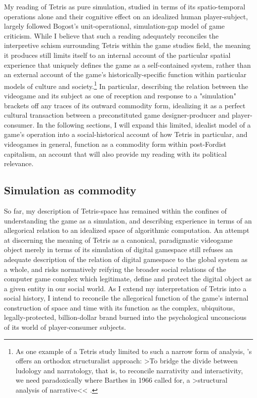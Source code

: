 My reading of Tetris as pure simulation, studied in terms of its spatio-temporal operations alone and their cognitive effect on an idealized human player-subject, largely followed Bogost's unit-operational, simulation-gap model of game criticism. While I believe that such a reading adequately reconciles the interpretive schism surrounding Tetris within the game studies field, the meaning it produces still limits itself to an internal account of the particular spatial experience that uniquely defines the game as a self-contained system, rather than an external account of the game's historically-specific function within particular models of culture and society.\footnote{
  As one example of a Tetris study limited to such a narrow form of analysis, \citeauthor{Post2009}'s  offers an orthodox structuralist approach: >To bridge the divide between ludology and narratology, that is, to reconcile narrativity and interactivity, we need paradoxically where Barthes in 1966 called for, a >structural analysis of narrative<< \autocite[36]{Post2009}.
  }
In particular, describing the relation between the videogame and its subject as one of reception and response to a "simulation" brackets off any traces of its outward commodity form, idealizing it as a perfect cultural transaction between a preconstituted game designer-producer and player-consumer. In the following sections, I will expand this limited, idealist model of a game's operation into a social-historical account of how Tetris in particular, and videogames in general, function as a commodity form within post-Fordist capitalism, an account that will also provide my reading with its political relevance.

\subsection*{Simulation as commodity}
So far, my description of Tetris-space has remained within the confines of understanding the game as a simulation, and describing experience in terms of an allegorical relation to an idealized space of algorithmic computation. An attempt at discerning the meaning of Tetris as a canonical, paradigmatic videogame object merely in terms of its simulation of digital gamespace still refuses an adequate description of the relation of digital gamespace to the global system as a whole, and risks normatively reifying the broader social relations of the computer game complex which legitimate, define and protect the digital object as a given entity in our social world. As I extend my interpretation of Tetris into a social history, I intend to reconcile the allegorical function of the game's internal construction of space and time with its function as the complex, ubiquitous, legally-protected, billion-dollar brand burned into the psychological unconscious of its world of player-consumer subjects.

